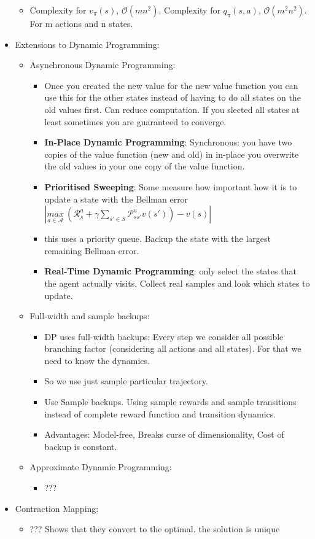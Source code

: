 \begin{itemize}[noitemsep,nolistsep]
\begin{itemize}[noitemsep,nolistsep]
		\item Complexity for $v_\pi(s)$, $\mathcal{O}(mn^2)$. Complexity for $q_\pi(s,a)$, $\mathcal{O}(m^2n^2)$. For m actions and n states.
	\end{itemize}
	\item Extensions to Dynamic Programming:
	\begin{itemize}[noitemsep,nolistsep]
		\item Asynchronous Dynamic Programming:
		\begin{itemize}[noitemsep,nolistsep]
			\item Once you created the new value for the new value function you can use this for the other states instead of having to do all states on the old values first. Can reduce computation. If you slected all states at least sometimes you are guaranteed to converge.
			\item \textbf{In-Place Dynamic Programming}: Synchronous: you have two copies of the value function (new and old) in in-place you overwrite the old values in your one copy of the value function.
			\item \textbf{Prioritised Sweeping}: Some measure how important how it is to update a state with the Bellman error $|\underset{a \in \mathcal{A}}{max}\ (\mathcal{R}_s^a + \gamma \sum_{s' \in S}\mathcal{P}_{ss'}^a v(s')) - v(s)|$
			\item this uses a priority queue. Backup the state with the largest remaining Bellman error.
			\item \textbf{Real-Time Dynamic Programming}: only select the states that the agent actually visits. Collect real samples and look which states to update.
		\end{itemize}
		\item Full-width and sample backups:
		\begin{itemize}[noitemsep,nolistsep]
			\item DP uses full-width backups: Every step we consider all possible branching factor (considering all actions and all states). For that we need to know the dynamics.
			\item So we use just sample particular trajectory.
			\item Use Sample backups. Using sample rewards and sample transitions instead of complete reward function and transition dynamics.
			\item Advantages: Model-free, Breaks curse of dimensionality, Cost of backup is constant.
		\end{itemize}
		\item Approximate Dynamic Programming:
		\begin{itemize}[noitemsep,nolistsep]
			\item ???
		\end{itemize}
	\end{itemize}
	\item Contraction Mapping:
	\begin{itemize}[noitemsep,nolistsep]
		\item ??? Shows that they convert to the optimal. the solution is unique
	\end{itemize}
\end{itemize}
